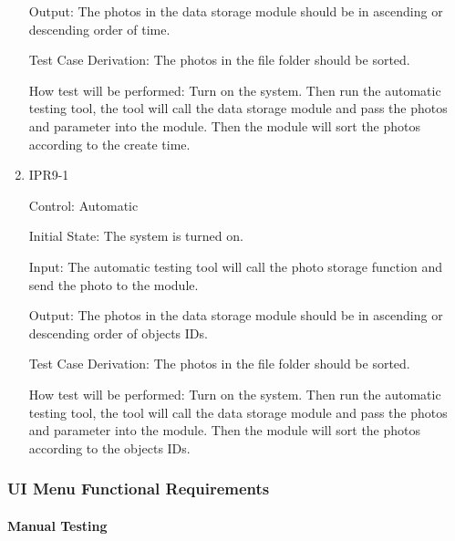 \documentclass[12pt, titlepage]{article}
\begin{document}
\begin{enumerate}
Output: The photos in the data storage module should be in ascending or descending order of time.

Test Case Derivation: The photos in the file folder should be sorted.
					
How test will be performed:
Turn on the system. Then run the automatic testing tool, the tool will call the data storage module and pass the photos and parameter into the module. Then the module will sort the photos according to the create time.


\item{IPR9-1\\}

Control: Automatic
					
Initial State: The system is turned on.
					
Input: The automatic testing tool will call the photo storage function and send the photo to the module. 
					
Output: The photos in the data storage module should be in ascending or descending order of objects IDs.

Test Case Derivation: The photos in the file folder should be sorted.
					
How test will be performed:
Turn on the system. Then run the automatic testing tool, the tool will call the data storage module and pass the photos and parameter into the module. Then the module will sort the photos according to the objects IDs.


				

\end{enumerate}


\subsubsection{UI Menu Functional Requirements}


\paragraph{Manual Testing}
\end{document}
